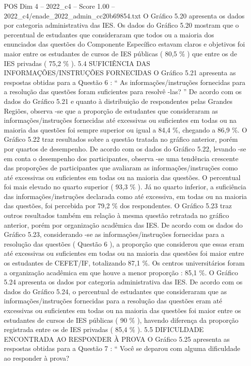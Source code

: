 \begin{textsample}{POS Dim 4 – 2022\_c4 – Score 1.00 – 2022\_c4/enade\_2022\_admin\_cc20b69854.txt}
O Gráfico 5.20 apresenta os dados por categoria administrativa das IES.
Os dados do Gráfico 5.20 mostram que o percentual de estudantes que consideraram que todos ou a maioria dos enunciados das questões do Componente Específico estavam claros e objetivos foi maior entre os estudantes de cursos de IES públicas ( 80,5 \% ) que entre os de IES privadas ( 75,2 \% ). 5.4 SUFICIÊNCIA DAS INFORMAÇÕES/INSTRUÇÕES FORNECIDAS O Gráfico 5.21 apresenta as respostas obtidas para a Questão 6 : “ As informações/instruções fornecidas para a resolução das questões foram suficientes para resolvê -las? ” De acordo com os dados do Gráfico 5.21 e quanto à distribuição de respondentes pelas Grandes Regiões, observa -se que a proporção de estudantes que consideraram as informações/instruções fornecidas até excessivas ou suficientes em todas ou na maioria das questões foi sempre superior ou igual a 84,4 \%, chegando a 86,9 \%.
O Gráfico 5.22 traz resultados sobre a questão tratada no gráfico anterior, porém por quartos de desempenho.
De acordo com os dados do Gráfico 5.22, levando -se em conta o desempenho dos participantes, observa -se uma tendência crescente das proporções de participantes que avaliaram as informações/instruções como até excessivas ou suficientes em todas ou na maioria das questões.
O percentual foi mais elevado no quarto superior ( 93,3 \% ).
Já no quarto inferior, a suficiência das informações/instruções declarada como até excessiva, em todas ou na maioria das questões, foi percebida por 79,2 \% dos respondentes.
O Gráfico 5.23 traz outros resultados também em relação à mesma questão retratada no gráfico anterior, porém por organização acadêmica das IES.
De acordo com os dados do Gráfico 5.23, considerando -se as informações/instruções fornecidas para a resolução das questões ( Questão 6 ), a proporção que considerou que essas eram até excessivas ou suficientes em todas ou na maioria das questões foi maior entre os estudantes de CEFET/IF, totalizando 87,1 \%.
Os centros universitários foram a organização acadêmica em que houve a menor proporção : 85,1 \%.
O Gráfico 5.24 apresenta os dados por categoria administrativa das IES.
De acordo com os dados do Gráfico 5.24, o percentual de estudantes que consideraram que as informações/instruções fornecidas para a resolução das questões eram até excessivas ou suficientes em todas ou na maioria das questões foi maior entre os estudantes de cursos de IES públicas ( 90 \% ), havendo diferença da proporção registrada entre os de IES privadas ( 85,4 \% ). 5.5 DIFICULDADE ENCONTRADA AO RESPONDER À PROVA O Gráfico 5.25 apresenta as respostas obtidas para a Questão 7 : “ Você se deparou com alguma dificuldade ao responder à prova?

\end{textsample}
